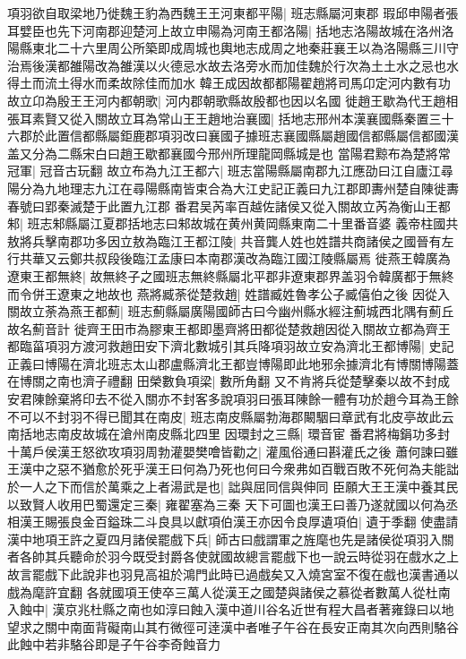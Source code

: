 項羽欲自取梁地乃徙魏王豹為西魏王王河東都平陽|{
	班志縣屬河東郡}
瑕邱申陽者張耳嬖臣也先下河南郡迎楚河上故立申陽為河南王都洛陽|{
	括地志洛陽故城在洛州洛陽縣東北二十六里周公所築即成周城也輿地志成周之地秦莊襄王以為洛陽縣三川守治焉後漢都雒陽改為雒漢以火德忌水故去洛旁水而加佳魏於行次為土土水之忌也水得土而流土得水而柔故除佳而加水}
韓王成因故都都陽翟趙將司馬卬定河内數有功故立卬為殷王王河内都朝歌|{
	河内郡朝歌縣故殷都也因以名國}
徙趙王歇為代王趙相張耳素賢又從入關故立耳為常山王王趙地治襄國|{
	括地志邢州本漢襄國縣秦置三十六郡於此置信都縣屬鉅鹿郡項羽改曰襄國子據班志襄國縣屬趙國信都縣屬信都國漢盖又分為二縣宋白曰趙王歇都襄國今邢州所理龍岡縣城是也}
當陽君黥布為楚將常冠軍|{
	冠音古玩翻}
故立布為九江王都六|{
	班志當陽縣屬南郡九江應劭曰江自廬江尋陽分為九地理志九江在尋陽縣南皆束合為大江史記正義曰九江郡即夀州楚自陳徙夀春號曰郢秦滅楚于此置九江郡}
番君吴芮率百越佐諸侯又從入關故立芮為衡山王都邾|{
	班志邾縣屬江夏郡括地志曰邾故城在黄州黄岡縣東南二十里番音婆}
義帝柱國共敖將兵擊南郡功多因立敖為臨江王都江陵|{
	共音龔人姓也姓譜共商諸侯之國晉有左行共華又云鄭共叔段後臨江孟康曰本南郡漢改為臨江國江陵縣屬焉}
徙燕王韓廣為遼東王都無終|{
	故無終子之國班志無終縣屬北平郡非遼東郡界盖羽令韓廣都于無終而令併王遼東之地故也}
燕將臧荼從楚救趙|{
	姓譜臧姓魯孝公子臧僖伯之後}
因從入關故立荼為燕王都薊|{
	班志薊縣屬廣陽國師古曰今幽州縣水經注薊城西北隅有薊丘故名薊音計}
徙齊王田市為膠東王都即墨齊將田都從楚救趙因從入關故立都為齊王都臨菑項羽方渡河救趙田安下濟北數城引其兵降項羽故立安為濟北王都博陽|{
	史記正義曰博陽在濟北班志太山郡盧縣濟北王都豈博陽即此地邪余據濟北有博關博陽蓋在博關之南也濟子禮翻}
田榮數負項梁|{
	數所角翻}
又不肯將兵從楚擊秦以故不封成安君陳餘棄將印去不從入關亦不封客多說項羽曰張耳陳餘一體有功於趙今耳為王餘不可以不封羽不得已聞其在南皮|{
	班志南皮縣屬勃海郡闞駰曰章武有北皮亭故此云南括地志南皮故城在滄州南皮縣北四里}
因環封之三縣|{
	環音宦}
番君將梅鋗功多封十萬戶侯漢王怒欲攻項羽周勃灌嬰樊噲皆勸之|{
	灌風俗通曰斟灌氏之後}
蕭何諫曰雖王漢中之惡不猶愈於死乎漢王曰何為乃死也何曰今衆弗如百戰百敗不死何為夫能詘於一人之下而信於萬乘之上者湯武是也|{
	詘與屈同信與伸同}
臣願大王王漢中養其民以致賢人收用巴蜀還定三秦|{
	雍翟塞為三秦}
天下可圖也漢王曰善乃遂就國以何為丞相漢王賜張良金百鎰珠二斗良具以獻項伯漢王亦因令良厚遺項伯|{
	遺于季翻}
使盡請漢中地項王許之夏四月諸侯罷戲下兵|{
	師古曰戲謂軍之旌麾也先是諸侯從項羽入關者各帥其兵聽命於羽今既受封爵各使就國故總言罷戲下也一說云時從羽在戲水之上故言罷戲下此說非也羽見高祖於鴻門此時已過戲矣又入燒宮室不復在戲也漢書通以戲為麾許宜翻}
各就國項王使卒三萬人從漢王之國楚與諸侯之慕從者數萬人從杜南入蝕中|{
	漢京兆杜縣之南也如淳曰蝕入漢中道川谷名近世有程大昌者著雍錄曰以地望求之關中南面背礙南山其冇微徑可逹漢中者唯子午谷在長安正南其次向西則駱谷此蝕中若非駱谷即是子午谷李奇蝕音力}
